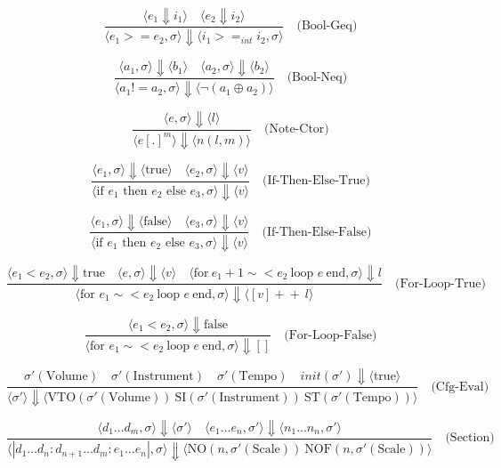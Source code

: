 \documentclass[letterpaper,12pt]{article}
\begin{document}
    \[
    \frac{\langle e_1 \Downarrow i_1 \rangle \quad \langle e_2 \Downarrow i_2 \rangle}
    {\langle e_1 >= e_2 , \sigma\rangle \Downarrow \langle i_1 >=_{int} i_2 , \sigma\rangle}  {} \quad \text{(Bool-Geq)}
    \]

    \[
    \frac{\langle a_1, \sigma \rangle \Downarrow \langle b_1 \rangle \quad \langle a_2, \sigma \rangle \Downarrow \langle b_2 \rangle}{\langle a_1 != a_2, \sigma \rangle \Downarrow \langle \neg (a_1 \oplus a_2) \rangle} \quad \text{(Bool-Neq)}
    \]

    \[
    \frac{\langle e, \sigma \rangle \Downarrow \langle l \rangle}{\langle e [.]^m \rangle \Downarrow \langle n(l, m)  \rangle} \quad \text{(Note-Ctor)}
    \]

    \[
    \frac{\langle e_1, \sigma \rangle \Downarrow \langle \text{true} \rangle \quad \langle e_2, \sigma \rangle \Downarrow \langle v \rangle}{\langle \text{if } e_1 \text{ then } e_2 \text{ else } e_3, \sigma \rangle \Downarrow \langle v \rangle} \quad \text{(If-Then-Else-True)}
    \]

    \[
    \frac{\langle e_1, \sigma \rangle \Downarrow \langle \text{false} \rangle \quad \langle e_3, \sigma \rangle \Downarrow \langle v \rangle}{\langle \text{if } e_1 \text{ then } e_2 \text{ else } e_3, \sigma \rangle \Downarrow \langle v \rangle} \quad \text{(If-Then-Else-False)}
    \]
    
    \[
    \frac{\langle e_1 < e_2, \sigma \rangle \Downarrow \text{true} \quad \langle e, \sigma \rangle \Downarrow \langle v \rangle \quad \langle \text{for}\ e_1+1 \sim< e_2 \ \text{loop } e \ \text{end}, \sigma \rangle \Downarrow l
    }{\langle 
        \text{for } e_1 \sim< e_2 \ \text{loop } e \ \text{end}, \sigma \rangle \Downarrow \langle [v]+\!\!\!+ \ l \rangle} \quad \text{(For-Loop-True)}
    \]

    \[
    \frac{\langle e_1 < e_2, \sigma \rangle \Downarrow \text{false}}{\langle 
        \text{for } e_1 \sim< e_2 \ \text{loop } e \ \text{end}, \sigma \rangle \Downarrow [] } \quad \text{(For-Loop-False)}
    \]
    
    \[
    \frac{\sigma'(\text{Volume}) \quad \sigma'(\text{Instrument}) \quad \sigma'(\text{Tempo}) \quad init(\sigma') \Downarrow \langle \text{true} \rangle}{\langle \sigma' \rangle \Downarrow \langle \text{VTO}(\sigma'(\text{Volume}))\ \text{SI}(\sigma'(\text{Instrument}))\ \text{ST}(\sigma'(\text{Tempo})) \rangle} \quad \text{(Cfg-Eval)}
    \]

    \[
    \frac{\langle d_1 \dots d_m, \sigma \rangle \Downarrow \langle \sigma' \rangle \quad \langle e_1 \dots e_n, \sigma' \rangle \Downarrow \langle n_1 \dots n_n , \sigma' \rangle}{\langle |d_1 \dots d_n:d_{n+1} \dots d_m:e_1 \dots e_n|, \sigma\rangle \Downarrow \langle 
    \text{NO}(n, \sigma'(\text{Scale}))\
    \text{NOF}(n, \sigma'(\text{Scale}))
    \rangle} \quad \text{(Section)}
    \]
\end{document}
